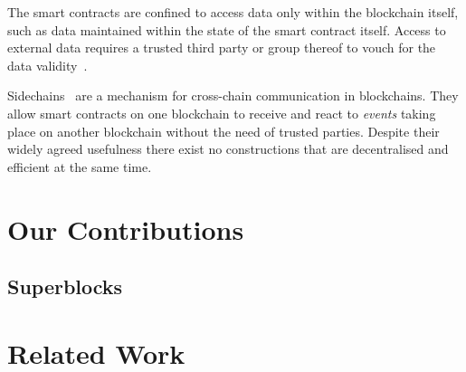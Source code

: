 
The smart contracts are confined to access data only within the blockchain
itself, such as data maintained within the state of the smart contract itself.
Access to external data
requires a trusted third party or group thereof to vouch for the data
validity~\cite{towncrier}.


Sidechains~\cite{sidechains} are a mechanism for cross-chain communication in
blockchains. They allow smart contracts on one blockchain to receive and
react to \textit{events} taking place on another blockchain without the need
of trusted parties. Despite their widely agreed usefulness
there exist no constructions that are decentralised and efficient at the same
time.

\section{Our Contributions}
\subsection{Superblocks}


\section{Related Work}
